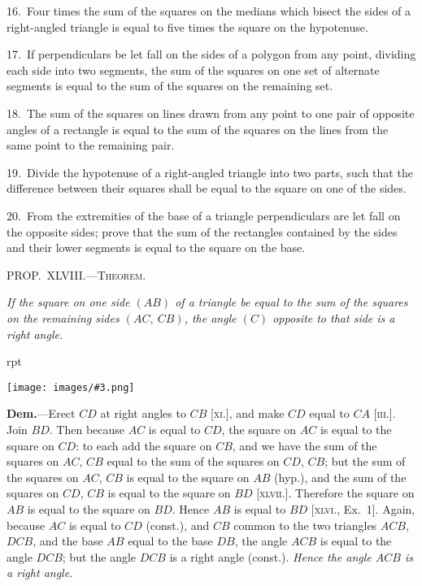 \documentclass[oneside]{book}
\newcounter{wrapwidth}
\newcommand\mypropl[2]{
\bigskip\Needspace*{4\baselineskip}\begin{center}\textsc{#1}\end{center}
\hspace{\parindent}\emph{#2}\par\medskip
}
\newcommand\imgflow[3]{
\setcounter{wrapwidth}{#1}
\begin{wrapfigure}[#2]{r}{\value{wrapwidth}pt}
\begin{center}
\vspace{-0.3in}
\texttt{[image: images/\#3.png]}
\end{center}
\end{wrapfigure}
}
\begin{document}
\begin{footnotesize}
16.~Four times the sum of the squares on the medians which
bisect the sides of a right-angled triangle is equal to five times
the square on the hypotenuse.

17.~If perpendiculars be let fall on the sides of a polygon from
any point, dividing each side into two segments, the sum of the
squares on one set of alternate segments is equal to the sum of the
squares on the remaining set.

18.~The sum of the squares on lines drawn from any point to
one pair of opposite angles of a rectangle is equal to the sum of
the squares on the lines from the same point to the remaining
pair.

19.~Divide the hypotenuse of a right-angled triangle into two
parts, such that the difference between their squares shall be
equal to the square on one of the sides.

20.~From the extremities of the base of a triangle perpendiculars
are let fall on the opposite sides; prove that the sum of the
rectangles contained by the sides and their lower segments is
equal to the square on the base.
\par\end{footnotesize}


\mypropl{PROP\@.~XLVIII\@.---Theorem.}{If the square on one side $(AB)$ of a triangle be equal to
the sum of the squares on the remaining sides $(AC,\ CB)$,
the angle $(C)$ opposite to that side is a right angle.}

\imgflow{107}{9}{f070}

\textbf{Dem.}---Erect $CD$ at right angles to $CB$ [\textsc{xi}.], and
make $CD$ equal to $CA$ [\textsc{iii}.]. Join
$BD$. Then because $AC$ is equal
to $CD$, the square on $AC$ is equal
to the square on $CD$: to each add
the square on $CB$, and we have the
sum of the squares on $AC$, $CB$
equal to the sum of the squares
on $CD$, $CB$; but the sum of the
squares on $AC$, $CB$ is equal to the
square on $AB$ (hyp.), and the sum of the squares on
$CD$, $CB$ is equal to the square on $BD$ [\textsc{xlvii}.]. Therefore
the square on $AB$ is equal to the square on $BD$.
Hence $AB$ is equal to $BD$ [\textsc{xlvi}., Ex.~1]. Again, because
$AC$ is equal to $CD$ (const.), and $CB$ common to
the two triangles $ACB$, $DCB$, and the base $AB$ equal
to the base $DB$, the angle $ACB$ is equal to the angle
$DCB$; but the angle $DCB$ is a right angle (const.).
\emph{Hence the angle $ACB$ is a right angle.}\par\medskip
\end{document}
